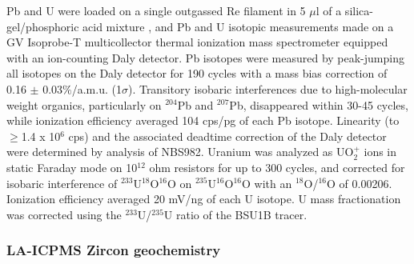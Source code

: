 \documentclass[11pt,letterpaper]{article}
\begin{document}
Pb and U were loaded on a single outgassed Re filament in 5 $\mu$l of a silica-gel/phosphoric acid mixture \citep{Gerstenberger1997a}, and Pb and U isotopic measurements made on a GV Isoprobe-T multicollector thermal ionization mass spectrometer equipped with an ion-counting Daly detector. Pb isotopes were measured by peak-jumping all isotopes on the Daly detector for 190 cycles with a mass bias correction of 0.16 $\pm$ 0.03$\%$/a.m.u. (1$\sigma$). Transitory isobaric interferences due to high-molecular weight organics, particularly on $^{204}$Pb and $^{207}$Pb, disappeared within 30-45 cycles, while ionization efficiency averaged 104 cps/pg of each Pb isotope. Linearity (to $\geq$1.4 x 10$^6$ cps) and the associated deadtime correction of the Daly detector were determined by analysis of NBS982. Uranium was analyzed as UO$_2^+$ ions in static Faraday mode on 10$^{12}$ ohm resistors for up to 300 cycles, and corrected for isobaric interference of $^{233}$U$^{18}$O$^{16}$O on $^{235}$U$^{16}$O$^{16}$O with an $^{18}$O/$^{16}$O of 0.00206. Ionization efficiency averaged 20 mV/ng of each U isotope. U mass fractionation was corrected using the $^{233}$U/$^{235}$U ratio of the BSU1B tracer. 

\subsubsection*{LA-ICPMS Zircon geochemistry}

\end{document}

